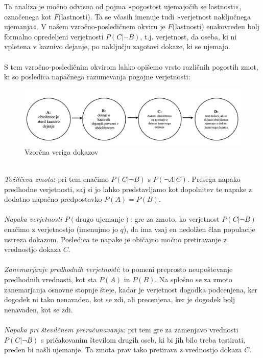 \documentclass[mat1, tisk]{fmfdelo}
\theoremstyle{definition} %
\theoremstyle{trditev} %
\theoremstyle{izrek}
\begin{document}
Ta analiza je močno odvisna od pojma »pogostost ujemajočih se lastnosti«, označenega kot $F$(lastnosti). Ta se včasih imenuje
tudi »verjetnost naključnega ujemanja«. V našem vzročno-posledičnem okviru je $F$(lastnosti) enakovreden bolj formalno opredeljeni verjetnosti
$P(C \lvert \neg B)$, t.j. verjetnost, da oseba, ki ni vpletena v kaznivo dejanje, po naključju zagotovi dokaze, ki se ujemajo.\\\\
S tem vzročno-posledičnim okvirom lahko opišemo vrsto različnih pogostih zmot, ki so posledica napačnega razumevanja pogojne verjetnosti:\\
\begin{figure}[h]\label{fig:slika_3}
    \centering
    \includegraphics[scale=0.60]{slika_3.png}
    \caption{Vzorčna veriga dokazov}
 \end{figure}
 \\
\textit{Tožilčeva zmota}: pri tem enačimo $P(C \lvert \neg B)$ s $P(\neg A \lvert C)$. Presega napako predhodne verjetnosti, saj si jo lahko 
predstavljamo kot dopolnitev te napake z dodatno napačno predpostavko $P(A) = P(B)$.\\\\
\textit{Napaka verjetnosti $P(\text{drugo ujemanje})$}: gre za zmoto, ko verjetnost $P(C \lvert \neg B)$ enačimo z verjetnostjo
(imenujmo jo $q$), da ima vsaj en nedolžen član populacije ustreza dokazom. Posledica te napake je običajno močno pretiravanje z vrednostjo
dokaza $C$.\\\\
\textit{Zanemarjanje predhodnih verjetnosti}: to pomeni preprosto neupoštevanje predhodnih vrednosti, kot sta $P(A)$ in $P(B)$. Na splošno
se za zmoto zanemarjanja osnovne stopnje šteje, kadar je verjetnost dogodka podcenjena, ker dogodek ni tako nenavaden, kot se zdi,
ali precenjena, ker je dogodek bolj nenavaden, kot se zdi.\\\\
\textit{Napaka pri številčnem preračunavanju}: pri tem gre za zamenjavo vrednosti $P(C \lvert \neg B)$ s pričakovanim številom drugih oseb,
ki bi jih bilo treba testirati, preden bi našli ujemanje. Ta zmota prav tako pretirava z vrednostjo dokaza $C$.\\\\
\end{document}
